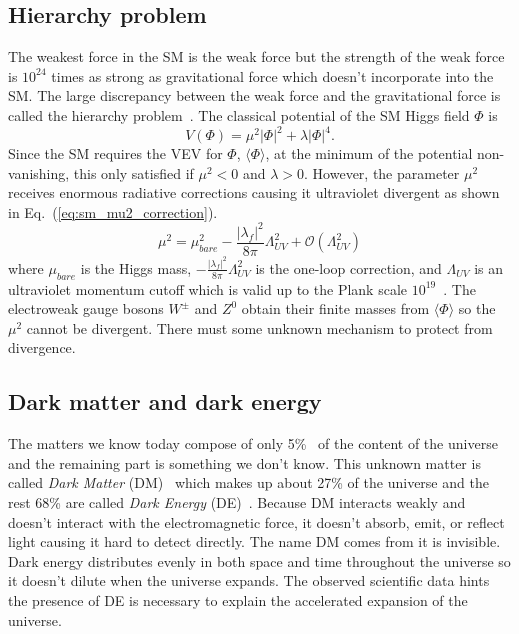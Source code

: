 \subsection{Hierarchy problem}
\label{subsec:sm_hierarchy_problem}
The weakest force in the SM is the weak force but the strength of the weak force is $10^{24}$ times as strong as gravitational force which doesn't incorporate into the SM.
The large discrepancy between the weak force and the gravitational force is called the hierarchy problem~\cite{Martin:1997ns, Chankowski:1998za, maarten_brak}.
The classical potential of the SM Higgs field $\Phi$ is
%
\begin{equation}
    V(\Phi) = \mu^{2} |\Phi|^2 + \lambda |\Phi|^4.
\end{equation}
%
Since the SM requires the VEV for $\Phi$, $\langle \Phi \rangle$, at the minimum of the potential non-vanishing, this only satisfied if $\mu^{2} < 0$ and $\lambda > 0$.
However, the parameter $\mu^{2}$ receives enormous radiative corrections causing it ultraviolet divergent as shown in Eq.~(\ref{eq:sm_mu2_correction}).
%
\begin{equation}
    \mu^{2} = \mu_{bare}^{2} - \frac{|\lambda_{f}|^{2}}{8\pi}\Lambda_{UV}^{2} + \mathcal{O}(\Lambda_{UV}^{2})
    \label{eq:sm_mu2_correction}
\end{equation}
%
where $\mu_{bare}$ is the Higgs mass, $- \frac{|\lambda_{f}|^{2}}{8\pi}\Lambda_{UV}^{2}$ is the one-loop correction, and $\Lambda_{UV}$ is an ultraviolet momentum cutoff which is valid up to the Plank scale $10^{19}$~{\GeV}.
The electroweak gauge bosons $W^{\pm}$ and $Z^{0}$ obtain their finite masses from $\langle \Phi \rangle$ so the $\mu^{2}$ cannot be divergent.
There must some unknown mechanism to protect from divergence.


\subsection{Dark matter and dark energy}
\label{subsec:sm_dm}
The matters we know today compose of only 5\%~\cite{Bennett:2012zja, Ade:2013sjv} of the content of the universe and the remaining part is something we don't know.
This unknown matter is called \textit{Dark Matter} (DM)~\cite{Bertone:2004pz} which makes up about 27\% of the universe and the rest 68\% are called \textit{Dark Energy} (DE)~\cite{Bennett:2012zja, Ade:2013sjv}.
Because DM interacts weakly and doesn't interact with the electromagnetic force, it doesn't absorb, emit, or reflect light causing it hard to detect directly. 
The name DM comes from it is invisible.
Dark energy distributes evenly in both space and time throughout the universe so it doesn't dilute when the universe expands.
The observed scientific data hints the presence of DE is necessary to explain the accelerated expansion of the universe.

